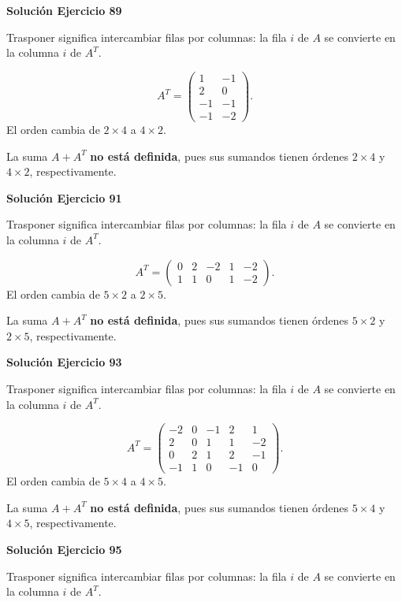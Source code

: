 \documentclass[12pt]{article}
\theoremstyle{remark}
\begin{document}
\par\bigskip\noindent\textbf{Solución Ejercicio 89}\par\nobreak
Trasponer significa intercambiar filas por columnas: la fila $i$ de $A$ se convierte en la columna $i$ de $A^T$.

\[
A^T=\begin{pmatrix}1&-1\\2&0\\-1&-1\\-1&-2\end{pmatrix}.
\]
El orden cambia de $2\times4$ a $4\times2$.

La suma $A+A^T$ \textbf{no está definida}, pues sus sumandos tienen órdenes $2\times4$ y $4\times2$, respectivamente.


\par\bigskip\noindent\textbf{Solución Ejercicio 91}\par\nobreak
Trasponer significa intercambiar filas por columnas: la fila $i$ de $A$ se convierte en la columna $i$ de $A^T$.

\[
A^T=\begin{pmatrix}0&2&-2&1&-2\\1&1&0&1&-2\end{pmatrix}.
\]
El orden cambia de $5\times2$ a $2\times5$.

La suma $A+A^T$ \textbf{no está definida}, pues sus sumandos tienen órdenes $5\times2$ y $2\times5$, respectivamente.


\par\bigskip\noindent\textbf{Solución Ejercicio 93}\par\nobreak
Trasponer significa intercambiar filas por columnas: la fila $i$ de $A$ se convierte en la columna $i$ de $A^T$.

\[
A^T=\begin{pmatrix}-2&0&-1&2&1\\2&0&1&1&-2\\0&2&1&2&-1\\-1&1&0&-1&0\end{pmatrix}.
\]
El orden cambia de $5\times4$ a $4\times5$.

La suma $A+A^T$ \textbf{no está definida}, pues sus sumandos tienen órdenes $5\times4$ y $4\times5$, respectivamente.


\par\bigskip\noindent\textbf{Solución Ejercicio 95}\par\nobreak
Trasponer significa intercambiar filas por columnas: la fila $i$ de $A$ se convierte en la columna $i$ de $A^T$.
\end{document}
